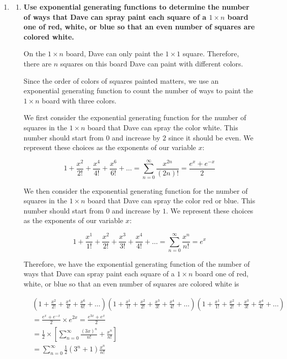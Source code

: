 \documentclass[10pt]{article}
\begin{document}
\begin{enumerate}
  The number of tilings of a $1 \times n$ board with $n \in \mathbb{N}, n \geq 2$ is $6B_{n-2} + B_{n-1}$.

  $$B_n=6B_{n-2} + B_{n-1}$$
  
\vskip 1cm

\item
\begin{enumerate}
\item
\textbf{Use exponential generating functions to determine the number of ways that Dave can spray paint each square of a $1\times n$ board one of red, white, or blue so that an even number of squares are colored white.}

On the $1 \times n$ board, Dave can only paint the $1\times 1$ square. Therefore, there are $n$ squares on this board Dave can paint with different colors.

Since the order of colors of squares painted matters, we use an exponential generating function to count the number of ways to paint the $1 \times n$ board with three colors.

We first consider the exponential generating function for the number of squares in the $1 \times n$ board that Dave can spray the color white. This number should start from $0$ and increase by $2$ since it should be even. We represent these choices as the exponents of our variable $x$:

$$1 + \frac{x^2}{2!}+\frac{x^4}{4!} + \frac{x^6}{6!} +\ldots=\sum\limits^{\infty}_{n=0}\frac{x^{2n}}{(2n)!}=\frac{e^x+e^{-x}}{2}$$

We then consider the exponential generating function for the number of squares in the $1 \times n$ board that Dave can spray the color red or blue. This number should start from $0$ and increase by $1$. We represent these choices as the exponents of our variable $x$:

$$1 + \frac{x^1}{1!} + \frac{x^2}{2!}+ \frac{x^3}{3!}+\frac{x^4}{4!}  +\ldots=\sum\limits^{\infty}_{n=0}\frac{x^n}{n!}=e^x$$

Therefore, we have the exponential generating function of the number of ways that Dave can spray paint each square of a $1\times n$ board one of red, white, or blue so that an even number of squares are colored white is

\begin{align*}
    &\left(1 + \frac{x^2}{2!}+\frac{x^4}{4!} + \frac{x^6}{6!} +\ldots\right)\left(1 + \frac{x^1}{1!} + \frac{x^2}{2!}+ \frac{x^3}{3!}+\frac{x^4}{4!}  +\ldots\right)\left(1 + \frac{x^1}{1!} + \frac{x^2}{2!}+ \frac{x^3}{3!}+\frac{x^4}{4!}  +\ldots\right) \\
    &=\frac{e^x+e^{-x}}{2} \times e^{2x}=\frac{e^{3x}+e^{x}}{2}\\
    &=\frac{1}{2} \times \left[\sum\limits_{n=0}^{\infty}\frac{(3x)^n}{n!} + \frac{x^n}{n!}\right]\\
    &=\sum\limits_{n=0}^{\infty}\frac{1}{2}\left(3^n+1\right)\frac{x^n}{n!}
\end{align*}


\end{enumerate}
\end{enumerate}
\end{document}
